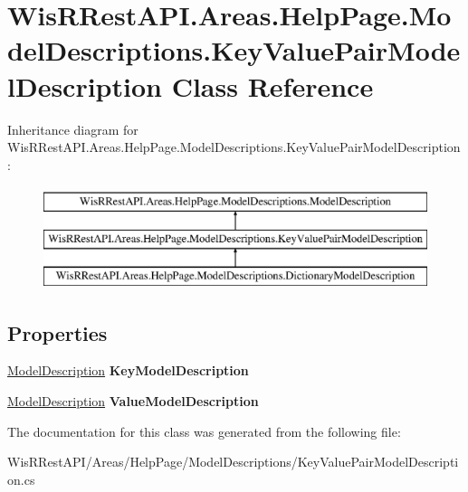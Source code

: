 \hypertarget{class_wis_r_rest_a_p_i_1_1_areas_1_1_help_page_1_1_model_descriptions_1_1_key_value_pair_model_description}{}\section{Wis\+R\+Rest\+A\+P\+I.\+Areas.\+Help\+Page.\+Model\+Descriptions.\+Key\+Value\+Pair\+Model\+Description Class Reference}
\label{class_wis_r_rest_a_p_i_1_1_areas_1_1_help_page_1_1_model_descriptions_1_1_key_value_pair_model_description}
Inheritance diagram for Wis\+R\+Rest\+A\+P\+I.\+Areas.\+Help\+Page.\+Model\+Descriptions.\+Key\+Value\+Pair\+Model\+Description\+:\begin{figure}[H]
\begin{center}
\leavevmode
\includegraphics[height=3.000000cm]{class_wis_r_rest_a_p_i_1_1_areas_1_1_help_page_1_1_model_descriptions_1_1_key_value_pair_model_description}
\end{center}
\end{figure}
\subsection*{Properties}
\begin{DoxyCompactItemize}
\item 
\hypertarget{class_wis_r_rest_a_p_i_1_1_areas_1_1_help_page_1_1_model_descriptions_1_1_key_value_pair_model_description_a7a197249ede5f1234b35baf27c54fa2a}{}\hyperlink{class_wis_r_rest_a_p_i_1_1_areas_1_1_help_page_1_1_model_descriptions_1_1_model_description}{Model\+Description} {\bfseries Key\+Model\+Description}\label{class_wis_r_rest_a_p_i_1_1_areas_1_1_help_page_1_1_model_descriptions_1_1_key_value_pair_model_description_a7a197249ede5f1234b35baf27c54fa2a}

\item 
\hypertarget{class_wis_r_rest_a_p_i_1_1_areas_1_1_help_page_1_1_model_descriptions_1_1_key_value_pair_model_description_ae42376073a1f7c8bb94764eee2c53b7b}{}\hyperlink{class_wis_r_rest_a_p_i_1_1_areas_1_1_help_page_1_1_model_descriptions_1_1_model_description}{Model\+Description} {\bfseries Value\+Model\+Description}\label{class_wis_r_rest_a_p_i_1_1_areas_1_1_help_page_1_1_model_descriptions_1_1_key_value_pair_model_description_ae42376073a1f7c8bb94764eee2c53b7b}

\end{DoxyCompactItemize}


The documentation for this class was generated from the following file\+:\begin{DoxyCompactItemize}
\item 
Wis\+R\+Rest\+A\+P\+I/\+Areas/\+Help\+Page/\+Model\+Descriptions/Key\+Value\+Pair\+Model\+Description.\+cs\end{DoxyCompactItemize}
